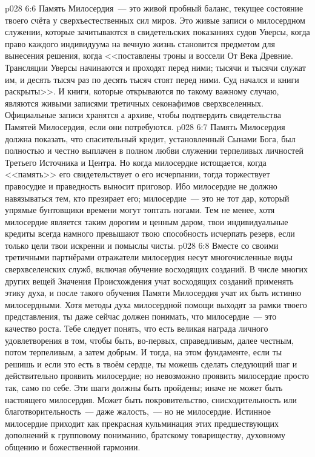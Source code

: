 \vs p028 6:6 Память Милосердия~--- это живой пробный баланс, текущее состояние твоего счёта у сверхъестественных сил миров. Это живые записи о милосердном служении, которые зачитываются в свидетельских показаниях судов Уверсы, когда право каждого индивидуума на вечную жизнь становится предметом для вынесения решения, когда <<поставлены троны и воссели От Века Древние. Трансляции Уверсы начинаются и проходят перед ними; тысячи и тысячи служат им, и десять тысяч раз по десять тысяч стоят перед ними. Суд начался и книги раскрыты>>. И книги, которые открываются по такому важному случаю, являются живыми записями третичных секонафимов сверхвселенных. Официальные записи хранятся а архиве, чтобы подтвердить свидетельства Памятей Милосердия, если они потребуются.
\vs p028 6:7 Память Милосердия должна показать, что спасительный кредит, установленный Сынами Бога, был полностью и честно выплачен в полном любви служении терпеливых личностей Третьего Источника и Центра. Но когда милосердие истощается, когда <<память>> его свидетельствует о его исчерпании, тогда торжествует правосудие и праведность выносит приговор. Ибо милосердие не должно навязываться тем, кто презирает его; милосердие~--- это не тот дар, который упрямые бунтовщики времени могут топтать ногами. Тем не менее, хотя милосердие является таким дорогим и ценным даром, твои индивидуальные кредиты всегда намного превышают твою способность исчерпать резерв, если только цели твои искренни и помыслы чисты.
\vs p028 6:8 \pc Вместе со своими третичными партнёрами отражатели милосердия несут многочисленные виды сверхвселенских служб, включая обучение восходящих созданий. В числе многих других вещей Значения Происхождения учат восходящих созданий применять этику духа, и после такого обучения Памяти Милосердия учат их быть истинно милосердными. Хотя методы духа милосердной помощи выходят за рамки твоего представления, ты даже сейчас должен понимать, что милосердие~--- это качество роста. Тебе следует понять, что есть великая награда личного удовлетворения в том, чтобы быть, во\hyp{}первых, справедливым, далее честным, потом терпеливым, а затем добрым. И тогда, на этом фундаменте, если ты решишь и если это есть в твоём сердце, ты можешь сделать следующий шаг и действительно проявить милосердие; но невозможно проявить милосердие просто так, само по себе. Эти шаги должны быть пройдены; иначе не может быть настоящего милосердия. Может быть покровительство, снисходительность или благотворительность~--- даже жалость,~--- но не милосердие. Истинное милосердие приходит как прекрасная кульминация этих предшествующих дополнений к групповому пониманию, братскому товариществу, духовному общению и божественной гармонии.
